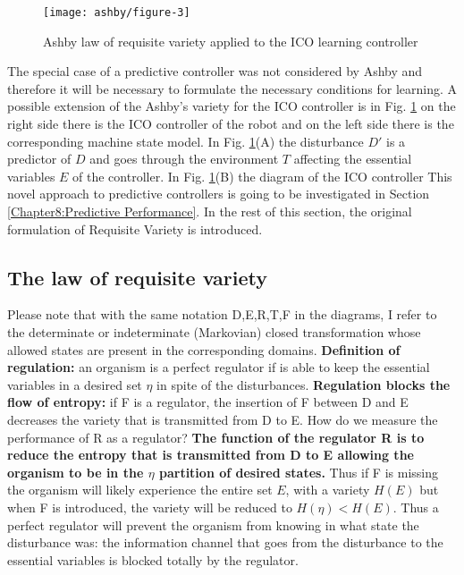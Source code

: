 \begin{figure}
\begin{center}
\texttt{[image: ashby/figure-3]}
\caption[Ashby law in predictive controllers]{
Ashby law of requisite variety applied to the ICO learning controller
\label{fig:infotheory:ashby2}}
\end{center}
\end{figure}

The special case of a predictive controller was not considered by Ashby and therefore
it will be necessary to formulate the necessary conditions for learning.
A possible extension of the Ashby's variety for the ICO controller is in Fig. \ref{fig:infotheory:ashby2}
on the right side there is the ICO controller of the robot and on the left side
there is the corresponding machine state model.
In Fig. \ref{fig:infotheory:ashby2}(A) the disturbance $D'$ is a predictor of $D$ and goes
through the environment $T$ affecting the essential variables $E$ of the controller.
In Fig. \ref{fig:infotheory:ashby2}(B) the diagram of the ICO controller 
This novel approach to predictive controllers is going to be investigated in Section \ref{Chapter8:Predictive Performance}.
In the rest of this section, the original formulation of Requisite Variety is 
introduced.

\subsection{The law of requisite variety}
Please note that with the same notation D,E,R,T,F in the diagrams, I refer to
 the determinate or indeterminate (Markovian) closed transformation whose
allowed states are present in the corresponding domains.
\textbf{Definition of regulation:} an organism is a perfect regulator if
is able to keep the essential variables in a desired set $\eta$ in spite
of the disturbances.
\textbf{Regulation blocks the flow of entropy: } if F is a regulator, the insertion
of F between D and E decreases the variety that is transmitted from D to E.
How do we measure the performance of R as a regulator?
\textbf{The function of the regulator R is to reduce the entropy that is transmitted
 from D to E allowing the organism to be in the $\eta$ partition of desired states.}
Thus if F is missing the organism will likely experience the entire set $E$, with
a variety $H(E)$ but when F is introduced, the variety will be reduced to $H(\eta)<H(E)$.
Thus a perfect regulator will prevent the organism from knowing in what state the
disturbance was: the information channel that goes from the disturbance to the
essential variables is blocked totally by the regulator.

